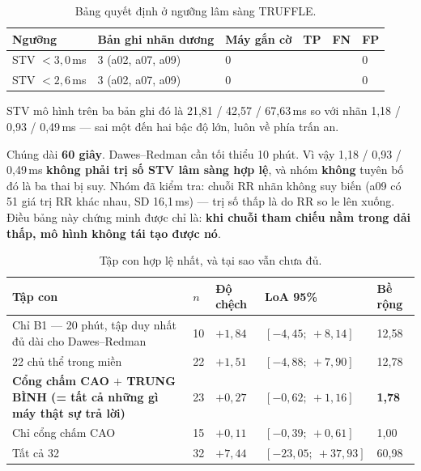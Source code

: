 \begin{table}[H]\centering\small
\caption{Bảng quyết định ở ngưỡng lâm sàng TRUFFLE.}
\label{tab:stv_nguong}
\begin{tabular}{@{}L{3.4cm} C{3.4cm} C{2.4cm} C{1.4cm} C{1.4cm} C{1.4cm}@{}}
\toprule
\textbf{Ngưỡng} & \textbf{Bản ghi nhãn dương} & \textbf{Máy gắn cờ} & \textbf{TP} & \textbf{FN} & \textbf{FP} \\
\midrule
STV $< 3{,}0$\,ms & 3 (a02, a07, a09) & 0 &  &  & 0 \\
STV $< 2{,}6$\,ms & 3 (a02, a07, a09) & 0 &  &  & 0 \\
\bottomrule
\end{tabular}
\end{table}

STV mô hình trên ba bản ghi đó là 21,81 / 42,57 / 67,63\,ms so với nhãn 1,18 / 0,93 / 0,49\,ms --- sai
một đến hai bậc độ lớn, luôn về phía trấn an.

\begin{canhbao}[title={Cảnh báo bắt buộc về ba bản ghi này}]
Chúng dài \textbf{60 giây}. Dawes--Redman cần tối thiểu 10 phút. Vì vậy 1,18 / 0,93 / 0,49\,ms
\textbf{không phải trị số STV lâm sàng hợp lệ}, và nhóm \textbf{không} tuyên bố đó là ba thai bị suy.
Nhóm đã kiểm tra: chuỗi RR nhãn không suy biến (a09 có 51 giá trị RR khác nhau, SD 16,1\,ms) --- trị số
thấp là do RR so le lên xuống. Điều bảng này chứng minh được chỉ là: \textbf{khi chuỗi tham chiếu nằm
trong dải thấp, mô hình không tái tạo được nó}.
\end{canhbao}

\begin{table}[H]\centering\small
\caption{Tập con hợp lệ nhất, và tại sao vẫn chưa đủ.}
\label{tab:stv_subset}
\begin{tabular}{@{}L{7.2cm} C{0.9cm} C{1.6cm} C{3.0cm} C{1.6cm}@{}}
\toprule
\textbf{Tập con} & $n$ & \textbf{Độ chệch} & \textbf{LoA 95\%} & \textbf{Bề rộng} \\
\midrule
Chỉ B1 --- 20 phút, tập duy nhất đủ dài cho Dawes--Redman & 10 & $+1{,}84$ &
$[-4{,}45;\ +8{,}14]$ & 12,58 \\
22 chủ thể trong miền & 22 & $+1{,}51$ & $[-4{,}88;\ +7{,}90]$ & 12,78 \\
\textbf{Cổng chấm CAO $+$ TRUNG BÌNH (= tất cả những gì máy thật sự trả lời)} & 23 & $+0{,}27$ &
$[-0{,}62;\ +1{,}16]$ & \textbf{1,78} \\
Chỉ cổng chấm CAO & 15 & $+0{,}11$ & $[-0{,}39;\ +0{,}61]$ & 1,00 \\
Tất cả 32 & 32 & $+7{,}44$ & $[-23{,}05;\ +37{,}93]$ & 60,98 \\
\bottomrule
\end{tabular}
\end{table}

